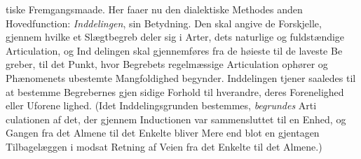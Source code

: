\documentclass[12pt,a4paper]{book}
\newcommand{\gk}[1]{\textit{#1}}
\begin{document}
tiske Fremgangsmaade. Her faaer nu den dialektiske Methodes
anden Hovedfunction: \emph{Inddelingen}, sin Betydning. Den
skal angive de Forskjelle, gjennem hvilke et Slægtbegreb deler
sig i Arter, dets naturlige og fuldstændige Articulation, og Ind\-%
delingen skal gjennemføres fra de høieste til de laveste Be\-%
greber, til det Punkt, hvor Begrebets regelmæssige Articulation
ophører og Phænomenets ubestemte Mangfoldighed begynder.
Inddelingen tjener saaledes til at bestemme Begrebernes gjen\-%
sidige Forhold til hverandre, deres Forenelighed eller Uforene\-%
lighed. (Idet Inddelingsgrunden bestemmes, \emph{begrundes} Arti\-%
culationen af det, der gjennem Inductionen var sammensluttet
til en Enhed, og Gangen fra det Almene til det Enkelte bliver
Mere end blot en gjentagen Tilbagelæggen i modsat Retning
af Veien fra det Enkelte til det Almene.)
\end{document}
